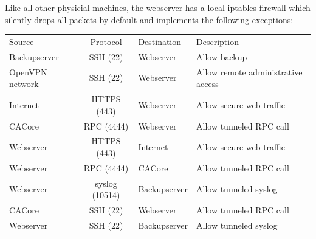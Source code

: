 \documentclass[a4paper, toc=index, 12pt, DIV14, twoside, BCOR2cm, headsepline, numbers=noenddot, bibliography=totoc]{scrbook}
\begin{document}
\begin{description}
Like all other physicial machines, the webserver has a local iptables firewall which silently drops all packets by default and implements the following exceptions:


\begin{tabular}{p{2.5cm} c l p{4.5cm}}
Source & Protocol & Destination & Description\\
\cline{1-4}
Backupserver & SSH (22) & Webserver & Allow backup\\
\cline{1-4}
OpenVPN network & SSH (22) & Webserver & Allow remote administrative access \\
\cline{1-4}
Internet & HTTPS (443) & Webserver & Allow secure web traffic\\
\cline{1-4}
CACore & RPC (4444) & Webserver & Allow tunneled RPC call\\
\cline{1-4}
Webserver & HTTPS (443) & Internet & Allow secure web traffic\\
\cline{1-4}
Webserver & RPC (4444) &  CACore& Allow tunneled RPC call\\
\cline{1-4}
Webserver & syslog (10514) & Backupserver & Allow tunneled syslog\\
\cline{1-4}
CACore & SSH (22) & Webserver & Allow tunneled RPC call\\
\cline{1-4}
Webserver & SSH (22) & Backupserver & Allow tunneled syslog\\
\end{tabular}


\end{description}
\end{document}
